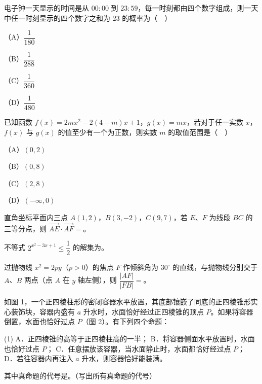 \begin{question}
电子钟一天显示的时间是从 $00\!:\!00$ 到 $23\!:\!59$，每一时刻都由四个数字组成，则一天中任一时刻显示的四个数字之和为 $23$ 的概率为（　）

（A）$\dfrac1{180}$

（B）$\dfrac1{288}$

（C）$\dfrac1{360}$

（D）$\dfrac1{480}$

\end{question}
\begin{question}
已知函数 $f(x)=2mx^2-2(4-m)x+1$，$g(x)=mx$，若对于任一实数 $x$，$f(x)$ 与 $g(x)$ 的值至少有一个为正数，则实数 $m$ 的取值范围是（　）

（A）$(0,2)$

（B）$(0,8)$

（C）$(2,8)$

（D）$(-\infty,0)$

\end{question}

\begin{question}
直角坐标平面内三点 $A(1,2)$，$B(3,-2)$，$C(9,7)$，若 $E$、$F$ 为线段 $BC$ 的三等分点，则 $\overrightarrow{AE}\cdot\overrightarrow{AF}=$\gkblank{}。

\end{question}
\begin{question}
不等式 $2^{x^2-3x+1}\leqslant\dfrac12$ 的解集为\gkblank{}。

\end{question}
\begin{question}
过抛物线 $x^2=2py$（$p>0$）的焦点 $F$ 作倾斜角为 $30^\circ$ 的直线，与抛物线分别交于 $A$、$B$ 两点（点 $A$ 在 $y$ 轴左侧），则 $\dfrac{|AF|}{|FB|}=$\gkblank{}。

\Needspace{0.4\textheight}
\end{question}
\begin{question}
如图 1，一个正四棱柱形的密闭容器水平放置，其底部镶嵌了同底的正四棱锥形实心装饰块，容器内盛有 $a$ 升水时，水面恰好经过正四棱锥的顶点 $P$。如果将容器倒置，水面也恰好过点 $P$（图 2）。有下列四个命题：

\begin{gkopts}(1)
\task A．正四棱锥的高等于正四棱柱高的一半；
\task B．将容器侧面水平放置时，水面也恰好过点 $P$；
\task C．任意摆放该容器，当水面静止时，水面都恰好经过点 $P$；
\task D．若往容器内再注入 $a$ 升水，则容器恰好能装满。
\end{gkopts}

其中真命题的代号是\gkblank{}。（写出所有真命题的代号）
\nopagebreak[4]
\begin{center}\end{center}
\nopagebreak[4]
\end{question}

